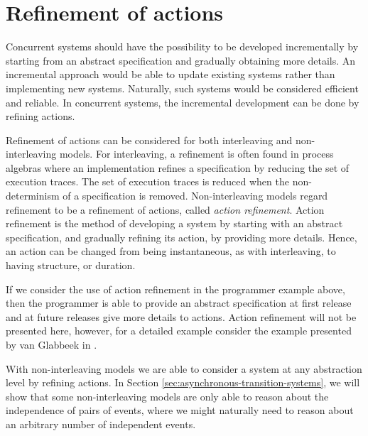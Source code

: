     \section{Refinement of actions}
        Concurrent systems should have the possibility to be developed incrementally by starting from an abstract specification and gradually obtaining more details. An incremental approach would be able to update existing systems rather than implementing new systems. Naturally, such systems would be considered efficient and reliable. In concurrent systems, the incremental development can be done by refining actions.
        
        Refinement of actions can be considered for both interleaving and non-interleaving models. For interleaving, a refinement is often found in process algebras where an implementation refines a specification by reducing the set of execution traces. The set of execution traces is reduced when the non-determinism of a specification is removed. Non-interleaving models regard refinement to be a refinement of actions, called \emph{action refinement}. Action refinement is the method of developing a system by starting with an abstract specification, and gradually refining its action, by providing more details. Hence, an action can be changed from being instantaneous, as with interleaving, to having structure, or duration.
        
        If we consider the use of action refinement in the programmer example above, then the programmer is able to provide an abstract specification at first release and at future releases give more details to actions. Action refinement will not be presented here, however, for a detailed example consider the example presented by van Glabbeek in \cite[Example 1.1]{GlabbeekG89refinement}.
        
        With non-interleaving models we are able to consider a system at any abstraction level by refining actions. In Section \ref{sec:asynchronous-transition-systems}, we will show that some non-interleaving models are only able to reason about the independence of pairs of events, where we might naturally need to reason about an arbitrary number of independent events. 
   
   

